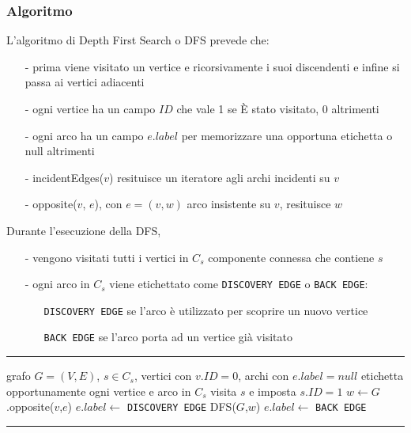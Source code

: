 \documentclass[a4paper]{article}
\makeatletter
\newenvironment{algo}[4]{
	\noindent\rule{\textwidth}{0.4pt}
	\begin{algorithmic}[1]
		\addtocounter{ALG@line}{-1}
		\Procedure{#1}{#2}
		\Require #3
		\Ensure #4
		\Statex }{
		\EndProcedure
	\end{algorithmic}
	\rule{\textwidth}{0.4pt}}
\makeatother
\begin{document}
\subsubsection*{Algoritmo}
L'algoritmo di Depth First Search o DFS prevede che:
\begin{itemize}[topsep=3pt, itemsep=0pt]
	\item[-] prima viene visitato un vertice e ricorsivamente i suoi discendenti e infine si passa ai vertici adiacenti
	\item[-] ogni vertice ha un campo \(I\!D\) che vale 1 se È stato visitato, 0 altrimenti
	\item[-] ogni arco ha un campo \(e.label\) per memorizzare una opportuna etichetta o null altrimenti
	\item[-] incidentEdges(\(v\)) resituisce un iteratore agli archi incidenti su \(v\)
	\item[-] opposite(\(v\), \(e\)), con \(e = (v,w)\) arco insistente su \(v\), resituisce \(w\)
\end{itemize}
Durante l'esecuzione della DFS,
\begin{itemize}[topsep=3pt, itemsep=0pt]
	\item[-] vengono visitati tutti i vertici in \(C_s\) componente connessa che contiene \(s\)
	\item[-] ogni arco in \(C_s\) viene etichettato come \verb|DISCOVERY EDGE| o \verb|BACK EDGE|:
	\begin{itemize}[topsep=0pt, itemsep=0pt]
		\item[] \verb|DISCOVERY EDGE| se l'arco è utilizzato per scoprire un nuovo vertice
		\item[] \verb|BACK EDGE| se l'arco porta ad un vertice già visitato
	\end{itemize}
\end{itemize}

\begin{algo}{DFS}{$G$,$s$}{grafo $G = (V,E)$, $s \in C_s$, vertici con \(v.I\!D = 0\), archi con \(e.label = null\)}{etichetta opportunamente ogni vertice e arco in \(C_s\)}
	\State visita \(s\) e imposta \(s.I\!D = 1\)
			\State \(w \gets G\).opposite(\(v\),\(e\))
				\State \(e.label \gets\) \verb|DISCOVERY EDGE|
				\State DFS(\(G\),\(w\))
			\Else
				\State \(e.label \gets\) \verb|BACK EDGE|
			\EndIf
		\EndIf
	\EndFor
\end{algo}
\end{document}
